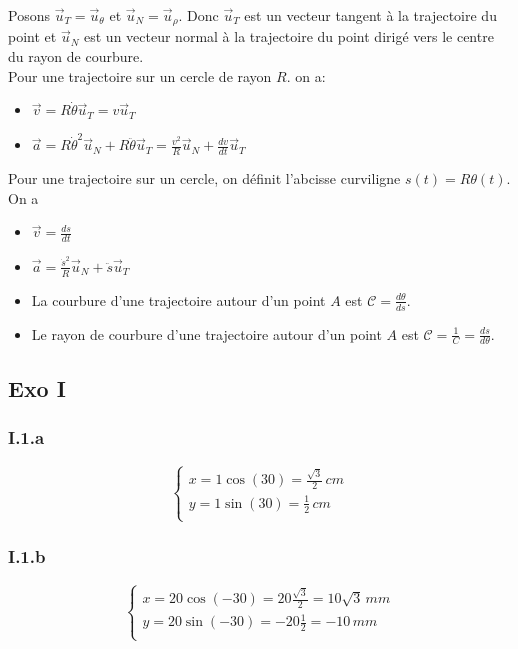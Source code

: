 \documentclass[]{book}
\theoremstyle{definition}
\begin{document}
Posons $\vec{u}_{T} = \vec{u}_{\theta}$ et $\vec{u}_{N} = \vec{u}_{\rho}$. Donc $\vec{u}_{T}$ est un vecteur tangent \`a la trajectoire du point et $\vec{u}_{N}$ est un vecteur normal \`a la trajectoire du point dirig\'e vers le centre du rayon de courbure.\\

Pour une trajectoire sur un cercle de rayon $R$. on a:

\begin{itemize}
\item $\vec{v} = R\dot{\theta}\vec{u}_{T} = v\vec{u}_{T}$
\item $\vec{a} = R\dot{\theta}^2\vec{u}_{N} + R\ddot{\theta}\vec{u}_{T}= \frac{v^2}{R}\vec{u}_{N} + \frac{dv}{dt}\vec{u}_{T}$
\end{itemize}


Pour une trajectoire sur un cercle, on d\'efinit l'abcisse curviligne $s(t)=R\theta(t)$. On a
\begin{itemize}
\item $\vec{v} = \frac{ds}{dt}$
\item $\vec{a} = \frac{\dot{s}^2}{R}\vec{u}_{N} + \ddot{s}\vec{u}_{T}$
\item La courbure d'une trajectoire autour d'un point $A$ est $\mathcal{C} = \frac{d\theta}{ds}$. 
\item Le rayon de courbure d'une trajectoire autour d'un point $A$ est $\mathcal{C} = \frac{1}{C} = \frac{ds}{d\theta}$.
\end{itemize}



\subsection*{Exo I}
\subsubsection*{I.1.a}
$$
\left\{
\begin{array}{l }
	x = 1 \cos(30) =  \frac{\sqrt{3}}{2}\, cm\\
	y = 1 \sin(30) =  \frac{1}{2}\, cm\\
\end{array}
\right. 
$$

\subsubsection*{I.1.b}
$$
\left\{
\begin{array}{l }
	x = 20 \cos(-30) =  20 \frac{\sqrt{3}}{2} = 10\sqrt{3}\, mm\\
	y = 20 \sin(-30) =  -20 \frac{1}{2} = -10\, mm\\
\end{array}
\right. 
$$
\end{document}
